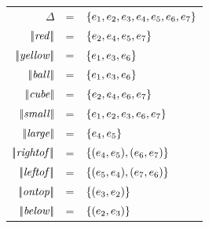 \begin{figure}[t]
\begin{flushleft}
\begin{tabular}{rcl}
$\Delta$              & = & $\{e_1,e_2,e_3,e_4,e_5,e_6,e_7\}$\\
$|\!|\mathit{red}|\!|$      & = & $\{e_2,e_4,e_5,e_7\}$\\
$|\!|\mathit{yellow}|\!|$   & = & $\{e_1,e_3,e_6\}$\\
$|\!|\mathit{ball}|\!|$     & = & $\{e_1,e_3,e_6\}$\\
$|\!|\mathit{cube}|\!|$     & = & $\{e_2,e_4,e_6,e_7\}$\\

$|\!|\mathit{small}|\!|$    & = & $\{e_1,e_2,e_3,e_6,e_7\}$\\
$|\!|\mathit{large}|\!|$    & = & $\{e_4,e_5\}$\\

$|\!|\mathit{rightof}|\!|$   & = & $\{(e_4,e_5),(e_6,e_7)\}$\\
$|\!|\mathit{leftof}|\!|$    & = & $\{(e_5,e_4),(e_7,e_6)\}$\\
$|\!|\mathit{ontop}|\!|$     & = & $\{(e_3,e_2)\}$\\
$|\!|\mathit{below}|\!|$     & = & $\{(e_2,e_3)\}$\\


\end{tabular}
\end{flushleft}
\end{figure}
